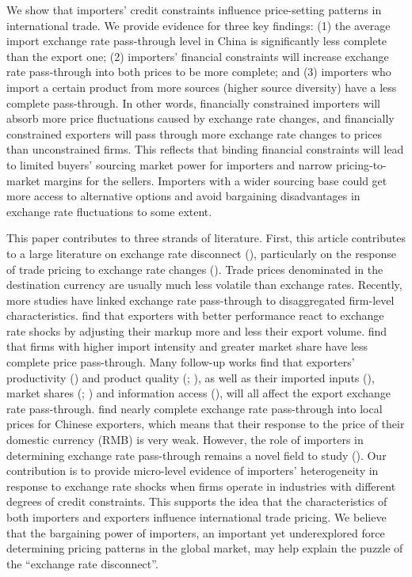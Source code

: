 We show that importers' credit constraints influence price-setting patterns in international trade. We provide evidence for three key findings: (1) the average import exchange rate pass-through level in China is significantly less complete than the export one; (2) importers' financial constraints will increase exchange rate pass-through into both prices to be more complete; and (3) importers who import a certain product from more sources (higher source diversity) have a less complete pass-through. In other words, financially constrained importers will absorb more price fluctuations caused by exchange rate changes, and financially constrained exporters will pass through more exchange rate changes to prices than unconstrained firms. This reflects that binding financial constraints will lead to limited buyers' sourcing market power for importers and narrow pricing-to-market margins for the sellers. Importers with a wider sourcing base could get more access to alternative options and avoid bargaining disadvantages in exchange rate fluctuations to some extent.

This paper contributes to three strands of literature. First, this article contributes to a large literature on exchange rate disconnect (\cite{obstfeld2000}), particularly on the response of trade pricing to exchange rate changes (\cite{campa2005}). Trade prices denominated in the destination currency are usually much less volatile than exchange rates. Recently, more studies have linked exchange rate pass-through to disaggregated firm-level characteristics. \cite{bmm2012} find that exporters with better performance react to exchange rate shocks by adjusting their markup more and less their export volume. \cite{aik2014} find that firms with higher import intensity and greater market share have less complete price pass-through. Many follow-up works find that exporters' productivity (\cite{lmx2015}) and product quality (\cite{chen2016}; \cite{auer2018}), as well as their imported inputs (\cite{wang-yu2021}), market shares (\cite{auer2016}; \cite{devereux2017}) and information access (\cite{garetto2016}), will all affect the export exchange rate pass-through. \cite{lmx2015} find nearly complete exchange rate pass-through into local prices for Chinese exporters, which means that their response to the price of their domestic currency (RMB) is very weak. However, the role of importers in determining exchange rate pass-through remains a novel field to study (\cite{alviarez2023}). Our contribution is to provide micro-level evidence of importers' heterogeneity in response to exchange rate shocks when firms operate in industries with different degrees of credit constraints. This supports the idea that the characteristics of both importers and exporters influence international trade pricing. We believe that the bargaining power of importers, an important yet underexplored force determining pricing patterns in the global market, may help explain the puzzle of the ``exchange rate disconnect''. 

